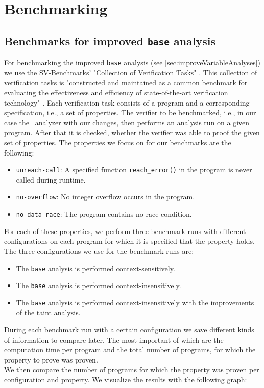   \section{Benchmarking}
    \subsection{Benchmarks for improved \texttt{base} analysis}
      For benchmarking the improved \texttt{base} analysis (see \autoref{sec:improveVariableAnalyses}) we use the SV-Benchmarks' "Collection of Verification Tasks" \parencite{svBench}. This collection of verification tasks is "constructed and maintained as a common benchmark for evaluating the effectiveness and efficiency of state-of-the-art verification technology" \parencite{svBench}. Each verification task consists of a program and a corresponding specification, i.e., a set of properties. The verifier to be benchmarked, i.e., in our case the \gob\ analyzer with our changes, then performs an analysis run on a given program. After that it is checked, whether the verifier was able to proof the given set of properties. The properties we focus on for our benchmarks are the following:
      \begin{itemize}
        \item \texttt{unreach-call}: A specified function \texttt{reach\_error()} in the program is never called during runtime.
        \item \texttt{no-overflow}: No integer overflow occurs in the program.
        \item \texttt{no-data-race}: The program contains no race condition.
      \end{itemize}
      For each of these properties, we perform three benchmark runs with different configurations on each program for which it is specified that the property holds.
      The three configurations we use for the benchmark runs are:
      \begin{itemize}
        \item The \texttt{base} analysis is performed context-sensitively.
        \item The \texttt{base} analysis is performed context-insensitively.
        \item The \texttt{base} analysis is performed context-insensitively with the improvements of the taint analysis.
      \end{itemize}
      During each benchmark run with a certain configuration we save different kinds of information to compare later. The most important of which are the computation time per program and the total number of programs, for which the property to prove was proven.\\
      We then compare the number of programs for which the property was proven per configuration and property. We visualize the results with the following graph:

